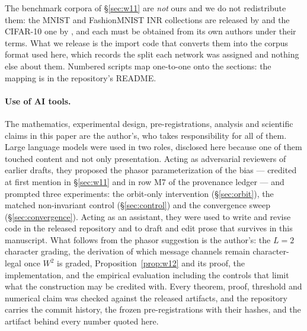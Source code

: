 \documentclass[10pt,twocolumn,letterpaper]{article}
\theoremstyle{definition}
\begin{document}
The benchmark corpora of \S\ref{sec:w11} are \emph{not} ours and we do not redistribute them: the
MNIST and FashionMNIST INR collections are released by \citet{navon2023dws} and the CIFAR-10 one by
\citet{zhou2023nfn}, and each must be obtained from its own authors under their terms. What we
release is the import code that converts them into the corpus format used here, which records the
split each network was assigned and nothing else about them. Numbered scripts map one-to-one onto
the sections: the mapping is in the repository's README.

\paragraph{Use of AI tools.} The mathematics, experimental design, pre-registrations, analysis
and scientific claims in this paper are the author's, who takes responsibility for all of them.
Large language models were used in two roles, disclosed here because one of them touched content
and not only presentation. Acting as adversarial reviewers of earlier drafts, they proposed the
phasor parameterization of the bias --- credited at first mention in \S\ref{sec:w11} and in row M7
of the provenance ledger --- and prompted three experiments: the orbit-only intervention
(\S\ref{sec:orbit}), the matched non-invariant control (\S\ref{sec:control}) and the convergence
sweep (\S\ref{sec:convergence}). Acting as an assistant, they were used to write and revise code in
the released repository and to draft and edit prose that survives in this manuscript. What follows
from the phasor suggestion is the author's: the $L=2$ character grading, the derivation of which
message channels remain character-legal once $W^2$ is graded, Proposition~\ref{prop:w12} and its
proof, the implementation, and the empirical evaluation including the controls that limit what the
construction may be credited with. Every theorem, proof, threshold and numerical claim was checked
against the released artifacts, and the repository carries the commit history, the frozen
pre-registrations with their hashes, and the artifact behind every number quoted here.
\end{document}
